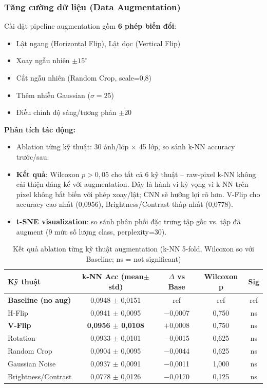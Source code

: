 \documentclass[12pt,a4paper]{article}
\let\oldtextbf\textbf
\renewcommand{\textbf}[1]{\oldtextbf{\textcolor{hcmublue}{#1}}}
\begin{document}
\subsubsection{Tăng cường dữ liệu (Data Augmentation)}

Cài đặt pipeline augmentation gồm \textbf{6 phép biến đổi}:
\begin{itemize}
    \item Lật ngang (Horizontal Flip), Lật dọc (Vertical Flip)
    \item Xoay ngẫu nhiên $\pm 15^{\circ}$
    \item Cắt ngẫu nhiên (Random Crop, scale=0,8)
    \item Thêm nhiễu Gaussian ($\sigma = 25$)
    \item Điều chỉnh độ sáng/tương phản $\pm 20$
\end{itemize}

\textbf{Phân tích tác động:}
\begin{itemize}
    \item Ablation từng kỹ thuật: 30 ảnh/lớp $\times$ 45 lớp, so sánh k-NN accuracy trước/sau. 
    \item \textbf{Kết quả}: Wilcoxon $p > 0{,}05$ cho tất cả 6 kỹ thuật -- raw-pixel k-NN không cải thiện đáng kể với augmentation. Đây là hành vi kỳ vọng vì k-NN trên pixel không bất biến với phép xoay/lật; CNN sẽ hưởng lợi rõ hơn. V-Flip cho accuracy cao nhất (0{,}0956), Brightness/Contrast thấp nhất (0{,}0778).
    \item \textbf{t-SNE visualization}: so sánh phân phối đặc trưng tập gốc vs. tập đã augment (9 mức số lượng class, perplexity=30).
\end{itemize}

\begin{table}[H]
\centering
\begin{tabular}{|l|c|c|c|c|}
\hline
\textbf{Kỹ thuật} & \textbf{k-NN Acc (mean$\pm$std)} & \textbf{$\Delta$ vs Base} & \textbf{Wilcoxon p} & \textbf{Sig} \\ \hline
\textbf{Baseline (no aug)} & 0{,}0948 $\pm$ 0{,}0151 & ref & ref & ref \\ \hline
H-Flip              & 0{,}0941 $\pm$ 0{,}0095 & $-$0{,}0007 & 0{,}750 & ns \\ \hline
\textbf{V-Flip}     & \textbf{0{,}0956 $\pm$ 0{,}0108} & $+$0{,}0008 & 0{,}750 & ns \\ \hline
Rotation            & 0{,}0933 $\pm$ 0{,}0101 & $-$0{,}0015 & 0{,}625 & ns \\ \hline
Random Crop         & 0{,}0904 $\pm$ 0{,}0095 & $-$0{,}0044 & 0{,}625 & ns \\ \hline
Gaussian Noise      & 0{,}0937 $\pm$ 0{,}0091 & $-$0{,}0011 & 1{,}000 & ns \\ \hline
Brightness/Contrast & 0{,}0778 $\pm$ 0{,}0126 & $-$0{,}0170 & 0{,}125 & ns \\ \hline
\end{tabular}
\caption{Kết quả ablation từng kỹ thuật augmentation (k-NN 5-fold, Wilcoxon so với Baseline; ns = not significant)}
\label{tab:aug_ablation}
\end{table}
\end{document}
